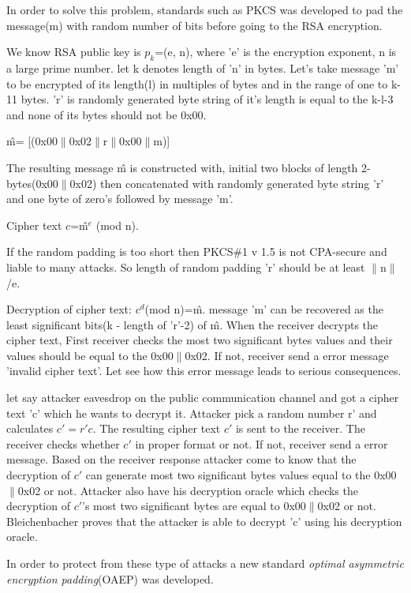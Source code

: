 \documentclass{article}
\begin{document}
 In order to solve this problem, standards such as PKCS was developed to pad the message(m) with random number of bits before going to the RSA encryption.
 
 We know RSA public key is $p_{k}$=(e, n), where 'e' is the encryption exponent, n is a large prime number. let k denotes length of 'n' in bytes. Let's take message 'm' to be encrypted of its length(l) in multiples of bytes and in the range of one to k-11 bytes. 'r' is randomly generated byte string of it's length is equal to the k-l-3 and none of its bytes should not be 0x00.
 
 \^{m}= [(0x00$\parallel$0x02$\parallel$r$\parallel$0x00$\parallel$m)]
 
 The resulting message \^{m} is constructed with, initial two blocks of length 2-bytes(0x00$\parallel$0x02) then concatenated with randomly generated byte string 'r' and one byte of zero's followed by message 'm'.
 
 Cipher text $c$=\^{m}$^{e}$ (mod n).
 
 If the random padding is too short then PKCS\#1 v 1.5 is not CPA-secure and liable to many attacks. So length of random padding 'r' should be at least $\parallel$n$\parallel$ /e. 
 
 Decryption of cipher text: $c^{d}$(mod n)=\^{m}. message 'm' can be recovered as the  least significant bits(k - length of 'r'-2) of \^{m}. When the receiver decrypts the cipher text, First receiver checks the  most two significant bytes values and their values should be equal to the 0x00$\parallel$0x02. If not, receiver send a error message 'invalid cipher text'. Let see how this error message leads to serious consequences.
 
 let say attacker eavesdrop on the public communication channel and got a cipher text 'c' which he wants to decrypt it. Attacker pick a random number r' and calculates $c'=r'c$. The resulting cipher text $c'$ is sent to the receiver. The receiver checks whether $c'$  in proper format or not. If not, receiver send a error message.
 Based on the receiver response attacker come to know that the decryption of $c'$ can generate most two significant bytes values equal to the 0x00$\parallel$0x02 or not. Attacker also have his decryption oracle which checks the decryption of $c'$'s most two significant bytes are equal to  0x00$\parallel$0x02 or not. Bleichenbacher proves that the attacker is able to decrypt 'c' using his decryption oracle.
 
 In order to protect from these type of attacks a new standard \textit{optimal asymmetric encryption padding}(OAEP) was developed.
\end{document}
